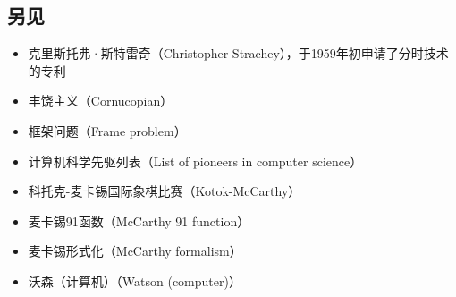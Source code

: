 \subsection{另见}
\begin{itemize}
\item 克里斯托弗·斯特雷奇（Christopher Strachey），于1959年初申请了分时技术的专利  
\item 丰饶主义（Cornucopian）  
\item 框架问题（Frame problem）  
\item 计算机科学先驱列表（List of pioneers in computer science）  
\item 科托克-麦卡锡国际象棋比赛（Kotok-McCarthy）  
\item 麦卡锡91函数（McCarthy 91 function）  
\item 麦卡锡形式化（McCarthy formalism）  
\item 沃森（计算机）（Watson (computer)）  
\end{itemize}
